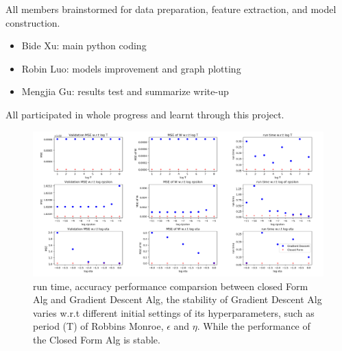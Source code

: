 \documentclass[letterpaper, 11pt]{article}
\renewcommand{\headrulewidth}{0pt}
\renewcommand{\footrulewidth}{0pt}
\begin{document}
All members brainstormed for data preparation, feature extraction, and model construction.
\begin{itemize}
    \item Bide Xu: main python coding
    \item Robin Luo: models improvement and graph plotting
    \item Mengjia Gu: results test and summarize write-up
\end{itemize}

All participated in whole progress and learnt through this project.


\nocite{*}





\begingroup


    


\endgroup
\renewcommand{\thepage}{}

%









\begin{figure}[!ht]
  \includegraphics[width=\linewidth]{fig/figure_cf_vs_gd.png}
  \caption{run time, accuracy performance comparsion between closed Form Alg and Gradient Descent Alg, the stability of Gradient Descent Alg varies w.r.t different initial settings of its hyperparameters, such as period (T) of Robbins Monroe, $\epsilon$ and $\eta$. While the performance of the Closed Form Alg is stable.}
  \label{fig:cf_vs_gd}
\end{figure}
\end{document}

